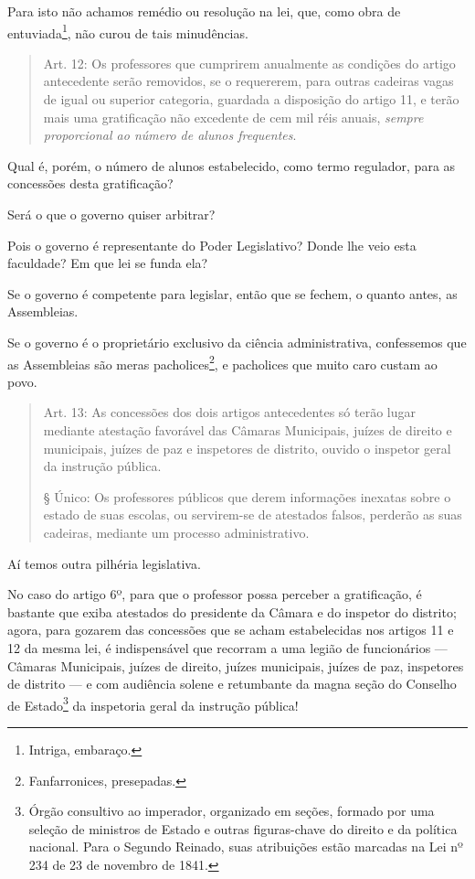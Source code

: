 Para isto não achamos remédio ou resolução na lei, que, como obra de
entuviada\footnote{Intriga, embaraço.}, não curou de tais minudências.

\begin{quote}
Art. 12: Os professores que cumprirem anualmente as condições do artigo
antecedente serão removidos, se o requererem, para outras cadeiras vagas
de igual ou superior categoria, guardada a disposição do artigo 11, e
terão mais uma gratificação não excedente de cem mil réis anuais,
\emph{sempre proporcional ao número de alunos frequentes}.
\end{quote}

Qual é, porém, o número de alunos estabelecido, como termo regulador,
para as concessões desta gratificação?

Será o que o governo quiser arbitrar?

Pois o governo é representante do Poder Legislativo? Donde lhe veio esta
faculdade? Em que lei se funda ela?

Se o governo é competente para legislar, então que se fechem, o quanto
antes, as Assembleias.

Se o governo é o proprietário exclusivo da ciência administrativa,
confessemos que as Assembleias são meras pacholices\footnote{
  Fanfarronices, presepadas.}, e pacholices que muito caro custam ao
povo.

\begin{quote}
Art. 13: As concessões dos dois artigos antecedentes só terão lugar
mediante atestação favorável das Câmaras Municipais, juízes de direito e
municipais, juízes de paz e inspetores de distrito, ouvido o inspetor
geral da instrução pública.

§ Único: Os professores públicos que derem informações inexatas sobre o
estado de suas escolas, ou servirem-se de atestados falsos, perderão as
suas cadeiras, mediante um processo administrativo.
\end{quote}

Aí temos outra pilhéria legislativa.

No caso do artigo 6º, para que o professor possa perceber a
gratificação, é bastante que exiba atestados do presidente da Câmara e
do inspetor do distrito; agora, para gozarem das concessões que se acham
estabelecidas nos artigos 11 e 12 da mesma lei, é indispensável que
recorram a uma legião de funcionários --- Câmaras Municipais, juízes de
direito, juízes municipais, juízes de paz, inspetores de distrito --- e
com audiência solene e retumbante da magna seção do Conselho de
Estado\footnote{Órgão consultivo ao imperador, organizado em seções,
  formado por uma seleção de ministros de Estado e outras figuras-chave
  do direito e da política nacional. Para o Segundo Reinado, suas
  atribuições estão marcadas na Lei nº 234 de 23 de novembro de 1841.}
da inspetoria geral da instrução pública!

